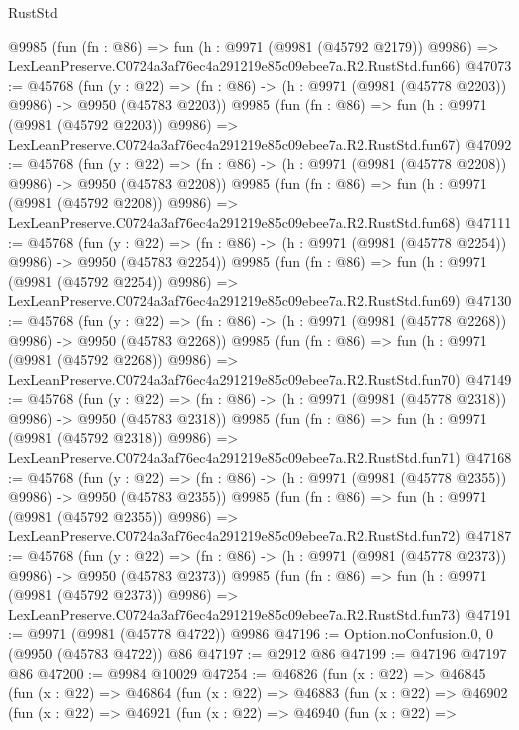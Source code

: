 \begin{lexlean}{RustStd}
\begin{coremodule}
    @9985
    (fun (fn : @86) =>
    fun (h : @9971 (@9981 (@45792 @2179)) @9986) =>
    LexLeanPreserve.C0724a3af76ec4a291219e85c09ebee7a.R2.RustStd.fun66)
@47073 := @45768
    (fun (y : @22) =>
    (fn : @86) -> (h : @9971 (@9981 (@45778 @2203)) @9986) -> @9950 (@45783 @2203))
    @9985
    (fun (fn : @86) =>
    fun (h : @9971 (@9981 (@45792 @2203)) @9986) =>
    LexLeanPreserve.C0724a3af76ec4a291219e85c09ebee7a.R2.RustStd.fun67)
@47092 := @45768
    (fun (y : @22) =>
    (fn : @86) -> (h : @9971 (@9981 (@45778 @2208)) @9986) -> @9950 (@45783 @2208))
    @9985
    (fun (fn : @86) =>
    fun (h : @9971 (@9981 (@45792 @2208)) @9986) =>
    LexLeanPreserve.C0724a3af76ec4a291219e85c09ebee7a.R2.RustStd.fun68)
@47111 := @45768
    (fun (y : @22) =>
    (fn : @86) -> (h : @9971 (@9981 (@45778 @2254)) @9986) -> @9950 (@45783 @2254))
    @9985
    (fun (fn : @86) =>
    fun (h : @9971 (@9981 (@45792 @2254)) @9986) =>
    LexLeanPreserve.C0724a3af76ec4a291219e85c09ebee7a.R2.RustStd.fun69)
@47130 := @45768
    (fun (y : @22) =>
    (fn : @86) -> (h : @9971 (@9981 (@45778 @2268)) @9986) -> @9950 (@45783 @2268))
    @9985
    (fun (fn : @86) =>
    fun (h : @9971 (@9981 (@45792 @2268)) @9986) =>
    LexLeanPreserve.C0724a3af76ec4a291219e85c09ebee7a.R2.RustStd.fun70)
@47149 := @45768
    (fun (y : @22) =>
    (fn : @86) -> (h : @9971 (@9981 (@45778 @2318)) @9986) -> @9950 (@45783 @2318))
    @9985
    (fun (fn : @86) =>
    fun (h : @9971 (@9981 (@45792 @2318)) @9986) =>
    LexLeanPreserve.C0724a3af76ec4a291219e85c09ebee7a.R2.RustStd.fun71)
@47168 := @45768
    (fun (y : @22) =>
    (fn : @86) -> (h : @9971 (@9981 (@45778 @2355)) @9986) -> @9950 (@45783 @2355))
    @9985
    (fun (fn : @86) =>
    fun (h : @9971 (@9981 (@45792 @2355)) @9986) =>
    LexLeanPreserve.C0724a3af76ec4a291219e85c09ebee7a.R2.RustStd.fun72)
@47187 := @45768
    (fun (y : @22) =>
    (fn : @86) -> (h : @9971 (@9981 (@45778 @2373)) @9986) -> @9950 (@45783 @2373))
    @9985
    (fun (fn : @86) =>
    fun (h : @9971 (@9981 (@45792 @2373)) @9986) =>
    LexLeanPreserve.C0724a3af76ec4a291219e85c09ebee7a.R2.RustStd.fun73)
@47191 := @9971 (@9981 (@45778 @4722)) @9986
@47196 := Option.noConfusion.{0, 0} (@9950 (@45783 @4722)) @86
@47197 := @2912 @86
@47199 := @47196 @47197 @86
@47200 := @9984 @10029
@47254 := @46826
    (fun (x : @22) =>
    @46845
      (fun (x : @22) =>
      @46864
        (fun (x : @22) =>
        @46883
          (fun (x : @22) =>
          @46902
            (fun (x : @22) =>
            @46921
              (fun (x : @22) =>
              @46940
                (fun (x : @22) =>

\end{coremodule}
\end{lexlean}

